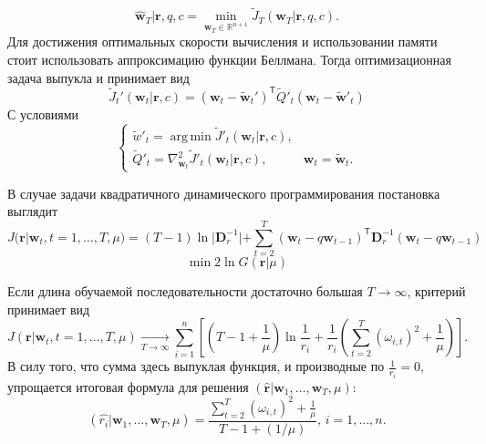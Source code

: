 \documentclass[12pt, twoside]{article}
\newenvironment{comment}{}{}
\DeclareMathOperator*{\argmin}{arg\,min}
\begin{document}
\begin{comment}
\begin{equation}
\hat{\textbf{w}}_{T}|\textbf{r}, q, c = \underset{\textbf{w}_T \in \mathbb{R}^{n+1}}\min \widetilde{J}_T(\textbf{w}_T|\textbf{r},q,c).
\end{equation}
Для достижения оптимальных скорости вычисления и использовании памяти стоит использовать аппроксимацию функции Беллмана. Тогда оптимизационная задача выпукла и принимает вид
\begin{equation}
\widetilde{J}_t'(\textbf{w}_t|\textbf{r},c) = (\textbf{w}_t - \widetilde{\textbf{w}}_t')^{\mathsf{T}}\widetilde{Q}'_t(\textbf{w}_t - \widetilde{\textbf{w}}'_t)
\end{equation}
С условиями
\begin{equation}
\begin{cases}
\widetilde{w}'_t = \argmin \widetilde{J}'_t(\textbf{w}_t|\textbf{r}, c), \\
\widetilde{Q}'_t = \nabla^2_{\textbf{w}_t}\widetilde{J}'_t(\textbf{w}_t|\textbf{r},c),& \textbf{w}_t = \widetilde{\textbf{w}}_t.
\end{cases}
\end{equation}

В случае задачи квадратичного динамического программирования постановка выглядит
\begin{equation}
J(\textbf{r}|\textbf{w}_t, t = 1,\ldots,T, \mu) = (T-1)\ln|\textbf{D}^{-1}_r| + \sum_{t=2}^T(\textbf{w}_t - q\textbf{w}_{t-1})^{\mathsf{T}}\textbf{D}^{-1}_r(\textbf{w}_t - q\textbf{w}_{t-1})
\end{equation}
\begin{equation}
\min 2\ln G(\textbf{r}|\mu)
\end{equation}

Если длина обучаемой последовательности достаточно большая $T \rightarrow \infty$, критерий принимает вид 
\begin{equation}
J(\textbf{r}|\textbf{w}_t, t=1,\ldots,T,\mu) \underset{T \rightarrow \infty}{\rightarrow} \sum_{i=1}^n\left[\left(T - 1 + \frac{1}{\mu}\right)\ln\frac{1}{r_i} + \frac{1}{r_i}\left(\sum_{t = 2}^T(\omega_{i,t})^2 + \frac{1}{\mu}\right)\right].
\end{equation}
В силу того, что сумма здесь выпуклая функция, и производные по $\frac{1}{r_i} = 0$, упрощается итоговая формула для решения $(\hat{\textbf{r}}|\textbf{w}_1, \ldots  ,\textbf{w}_T, \mu)$:
\begin{equation}
(\hat{r_i}|\textbf{w}_1, \ldots, \textbf{w}_T, \mu) = \frac{\sum_{t=2}^T(\omega_{i,t})^2 + \frac{1}{\mu}}{T - 1 + (1/\mu)},\, i=1,\ldots,n.  
\end{equation}
\end{comment}
\end{document}
